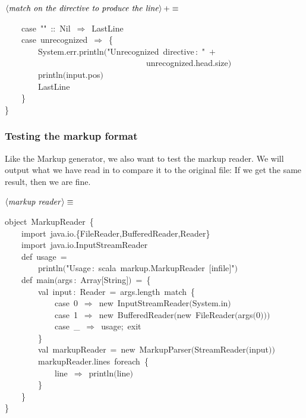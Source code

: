 \documentclass[a4paper,12pt]{article}
\begin{document}
$\left<\mbox{\emph{match on the directive to produce the line}}\right>+\equiv$
\begin{program}~~~~{\vem case}~""~{\rm :}{\rm :}~Nil~$\Rightarrow$~LastLine
\\~~~~{\vem case}~unrecognized~$\Rightarrow$~{\small\{}
\\~~~~~~~~System.err.println$($"Unrecognized~directive\,{\rm :}~"~$+$
\\~~~~~~~~~~~~~~~~~~~~~~~~~~~~~~~~~~unrecognized.head.size$)$
\\~~~~~~~~println$($input.pos$)$
\\~~~~~~~~LastLine
\\~~~~{\small\}}
\\{\small\}}
\\[0.5em]\end{program}


\subsubsection{Testing the markup format}
Like the Markup generator, we also want to test the markup reader.
We will output what we have read in to compare it to the original
file: If we get the same result, then we are fine.

$\left<\mbox{\emph{markup reader}}\right>\equiv$
\begin{program}{\vem object}~MarkupReader~{\small\{}
\\~~~~{\vem import}~java.io.{\small\{}FileReader,BufferedReader,Reader{\small\}}
\\~~~~{\vem import}~java.io.InputStreamReader
\\[0.5em]~~~~{\vem def}~usage~=
\\~~~~~~~~println$($"Usage\,{\rm :}~scala~markup.MarkupReader~$[$infile$]$"$)$
\\[0.5em]~~~~{\vem def}~main$($args\,{\rm :}~Array$[$String$]$$)$~=~{\small\{}
\\~~~~~~~~{\vem val}~input\,{\rm :}~Reader~=~args.length~{\vem match}~{\small\{}
\\~~~~~~~~~~~~{\vem case}~0~$\Rightarrow$~{\vem new}~InputStreamReader$($System.in$)$
\\~~~~~~~~~~~~{\vem case}~1~$\Rightarrow$~{\vem new}~BufferedReader$(${\vem new}~FileReader$($args$($0$)$$)$$)$
\\~~~~~~~~~~~~{\vem case}~\_~$\Rightarrow$~usage;~exit
\\~~~~~~~~{\small\}}
\\~~~~~~~~{\vem val}~markupReader~=~{\vem new}~MarkupParser$($StreamReader$($input$)$$)$
\\~~~~~~~~markupReader.lines~foreach~{\small\{}
\\~~~~~~~~~~~~line~$\Rightarrow$~println$($line$)$
\\~~~~~~~~{\small\}}
\\~~~~{\small\}}
\\{\small\}}
\\[0.5em]\end{program}
\end{document}
